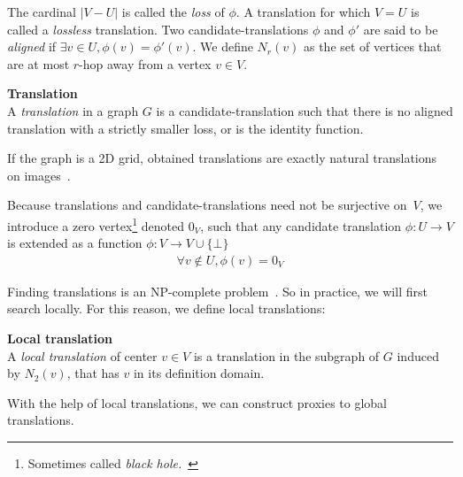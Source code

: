 The cardinal $|V-U|$ is called the \emph{loss} of $\phi$.
A translation for which $V=U$ is called a \emph{lossless} translation.
Two candidate-translations $\phi$ and $\phi'$ are said to be \emph{aligned} if $\exists v\in U, \phi(v) = \phi'(v)$.
We define $N_r(v)$ as the set of vertices that are at most $r$-hop away from a vertex $v \in V$.\\

\begin{definition}\textbf{Translation}\\
  A \emph{translation} in a graph $G$ is a candidate-translation such that there is no aligned translation with a strictly smaller loss, or is the identity function.
\end{definition}

If the graph is a 2D grid, obtained translations are exactly natural translations on images~\cite{GrePasViaGri201610}.

Because translations and candidate-translations need not be surjective on~$V$, we introduce a zero vertex\footnote{Sometimes called \emph{black hole.}~\citep{GrePasViaGri201610}} denoted $0_V$, such that any candidate translation $\phi: U \to V$ is extended as a function $\phi: V \to V \cup \{\bot\}$
\begin{gather}
\forall v \notin U, \phi(v) = 0_V
\end{gather}

Finding translations is an NP-complete problem~\citep{pasdeloup2017translations}. So in practice, we will first search locally. For this reason, we define local translations:

\begin{definition}\textbf{Local translation}\\
A \emph{local translation} of center $v \in V$ is a translation in the subgraph of $G$ induced by $N_2(v)$, that has $v$ in its definition domain.
\end{definition}

With the help of local translations, we can construct proxies to global translations.

